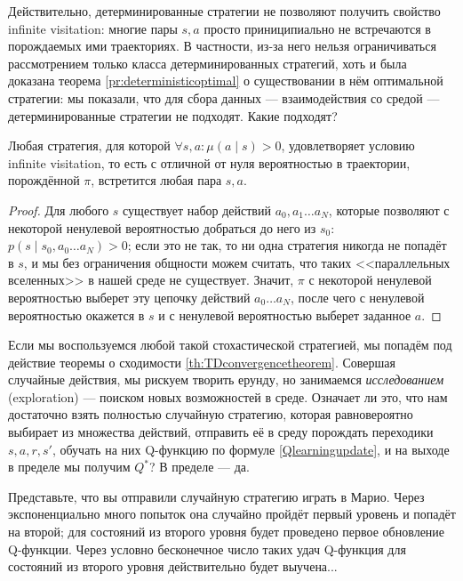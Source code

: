 Действительно, детерминированные стратегии не позволяют получить свойство infinite visitation: многие пары $s, a$ просто приниципиально не встречаются в порождаемых ими траекториях. В частности, из-за него нельзя ограничиваться рассмотрением только класса детерминированных стратегий, хоть и была доказана теорема \ref{pr:deterministicoptimal} о существовании в нём оптимальной стратегии: мы показали, что для сбора данных --- взаимодействия со средой --- детерминированные стратегии не подходят. Какие подходят?

\begin{theorem}
Любая стратегия, для которой $\forall s, a \colon \mu(a \mid s) > 0$, удовлетворяет условию infinite visitation, то есть с отличной от нуля вероятностью в траектории, порождённой $\pi$, встретится любая пара $s, a$.
\begin{proof}
Для любого $s$ существует набор действий $a_0, a_1 \dots a_N$, которые позволяют с некоторой ненулевой вероятностью добраться до него из $s_0$: $p(s \mid s_0, a_0 \dots a_N) > 0$; если это не так, то ни одна стратегия никогда не попадёт в $s$, и мы без ограничения общности можем считать, что таких <<параллельных вселенных>> в нашей среде не существует. Значит, $\pi$ с некоторой ненулевой вероятностью выберет эту цепочку действий $a_0 \dots a_N$, после чего с ненулевой вероятностью окажется в $s$ и с ненулевой вероятностью выберет заданное $a$.
\end{proof}
\end{theorem}

Если мы воспользуемся любой такой стохастической стратегией, мы попадём под действие теоремы о сходимости \ref{th:TDconvergencetheorem}. Совершая случайные действия, мы рискуем творить ерунду, но занимаемся \emph{исследованием} (exploration) --- поиском новых возможностей в среде. Означает ли это, что нам достаточно взять полностью случайную стратегию, которая равновероятно выбирает из множества действий, отправить её в среду порождать переходики $s, a, r, s'$, обучать на них Q-функцию по формуле \eqref{Qlearningupdate}, и на выходе в пределе мы получим $Q^*$? В пределе --- да.

\begin{example}
Представьте, что вы отправили случайную стратегию играть в Марио. Через экспоненциально много попыток она случайно пройдёт первый уровень и попадёт на второй; для состояний из второго уровня будет проведено первое обновление Q-функции. Через условно бесконечное число таких удач Q-функция для состояний из второго уровня действительно будет выучена...
\end{example}

